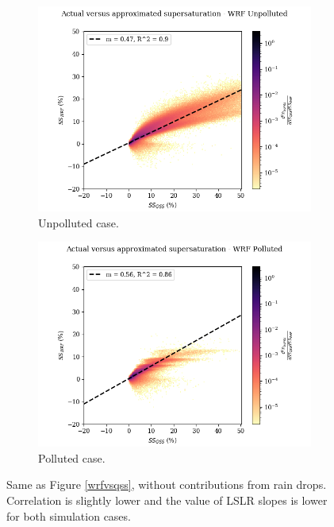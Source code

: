 \documentclass{article}
\begin{document}
\begin{figure}[ht]
	\centering
	\begin{subfigure}{0.7\textwidth}
		\includegraphics[width=\textwidth]{wrf/norainnovent_heatmap_ss_qss_vs_ss_wrf_Unpolluted_figure.png}
		\caption{Unpolluted case.}
		\label{norainnoventwrfvsqssunpoll}
	\end{subfigure}
	\begin{subfigure}{0.7\textwidth}
		\includegraphics[width=\textwidth]{wrf/norainnovent_heatmap_ss_qss_vs_ss_wrf_Polluted_figure.png}
		\caption{Polluted case.}
		\label{norainnoventwrfvsqsspoll}
	\end{subfigure}
	\caption{Same as Figure \ref{wrfvsqss}, without contributions from rain drops. Correlation is slightly lower and the value of LSLR slopes is lower for both simulation cases.}
	\label{norainnoventwrfvsqss}
\end{figure}
\end{document}
